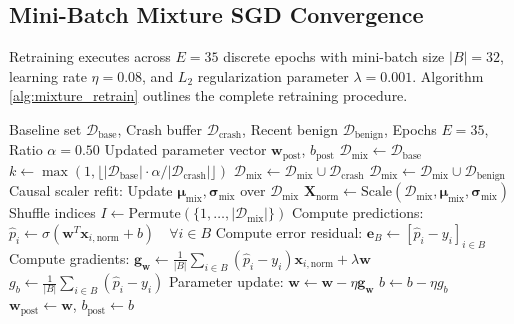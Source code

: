 \documentclass[12pt,a4paper,oneside]{report}
\begin{document}
\subsection{Mini-Batch Mixture SGD Convergence}
Retraining executes across $E = 35$ discrete epochs with mini-batch size $|B| = 32$, learning rate $\eta = 0.08$, and $L_2$ regularization parameter $\lambda = 0.001$. Algorithm \ref{alg:mixture_retrain} outlines the complete retraining procedure.

\begin{algorithm}[htbp]
\caption{Balanced Mixture Retraining Algorithm}
\label{alg:mixture_retrain}
\begin{algorithmic}[1]
\REQUIRE Baseline set $\mathcal{D}_{\text{base}}$, Crash buffer $\mathcal{D}_{\text{crash}}$, Recent benign $\mathcal{D}_{\text{benign}}$, Epochs $E=35$, Ratio $\alpha=0.50$
\ENSURE Updated parameter vector $\mathbf{w}_{\text{post}}$, $b_{\text{post}}$
\STATE $\mathcal{D}_{\text{mix}} \gets \mathcal{D}_{\text{base}}$
\STATE $k \gets \max(1, \lfloor |\mathcal{D}_{\text{base}}| \cdot \alpha / |\mathcal{D}_{\text{crash}}| \rfloor)$
    \STATE $\mathcal{D}_{\text{mix}} \gets \mathcal{D}_{\text{mix}} \cup \mathcal{D}_{\text{crash}}$
\ENDFOR
\STATE $\mathcal{D}_{\text{mix}} \gets \mathcal{D}_{\text{mix}} \cup \mathcal{D}_{\text{benign}}$
\STATE Causal scaler refit: Update $\boldsymbol{\mu}_{\text{mix}}, \boldsymbol{\sigma}_{\text{mix}}$ over $\mathcal{D}_{\text{mix}}$
\STATE $\mathbf{X}_{\text{norm}} \gets \text{Scale}(\mathcal{D}_{\text{mix}}, \boldsymbol{\mu}_{\text{mix}}, \boldsymbol{\sigma}_{\text{mix}})$
    \STATE Shuffle indices $I \gets \text{Permute}(\{1, \dots, |\mathcal{D}_{\text{mix}}|\})$
        \STATE Compute predictions: $\hat{p}_i \gets \sigma(\mathbf{w}^T \mathbf{x}_{i,\text{norm}} + b) \quad \forall i \in B$
        \STATE Compute error residual: $\mathbf{e}_B \gets [\hat{p}_i - y_i]_{i \in B}$
        \STATE Compute gradients:
        \STATE $\mathbf{g}_{\mathbf{w}} \gets \frac{1}{|B|} \sum_{i \in B} (\hat{p}_i - y_i) \mathbf{x}_{i,\text{norm}} + \lambda \mathbf{w}$
        \STATE $g_b \gets \frac{1}{|B|} \sum_{i \in B} (\hat{p}_i - y_i)$
        \STATE Parameter update:
        \STATE $\mathbf{w} \gets \mathbf{w} - \eta \mathbf{g}_{\mathbf{w}}$
        \STATE $b \gets b - \eta g_b$
    \ENDFOR
\ENDFOR
\RETURN $\mathbf{w}_{\text{post}} \gets \mathbf{w}$, \quad $b_{\text{post}} \gets b$
\end{algorithmic}
\end{algorithm}
\end{document}
